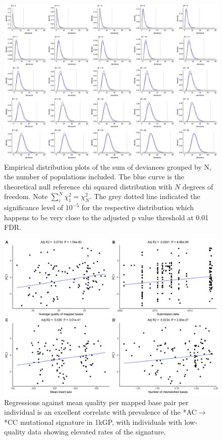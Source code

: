 \documentclass[9pt,lineno]{elife}
\begin{document}
\begin{figure}
\includegraphics[width=\hsize,keepaspectratio]{./Figures/AllDeviances.jpg}

\caption{Empirical distribution plots of the sum of deviances grouped by N, the number of populations included. The blue curve is the theoretical null reference chi squared distribution with $N$ degrees of freedom. Note $\sum_i^N  \chi^2_1= \chi^2_N$. The grey dotted line indicated the significance level of $10^{-5}$ for the respective distribution which happens to be very close to the adjusted p value threshold at 0.01 FDR. }
  \label{Manhattan}
\end{figure}

\begin{figure}
\includegraphics[width=\hsize,keepaspectratio]{./Figures/PC1_Correlation.jpg}
\caption{Regressions against mean quality per mapped base pair per individual is an excellent correlate with prevalence of the  *AC${\rightarrow}$*CC mutational signature in 1kGP, with individuals with low-quality data showing elevated rates of the signature.  }
\label{PC1_Correlation}
\end{figure}
\end{document}
